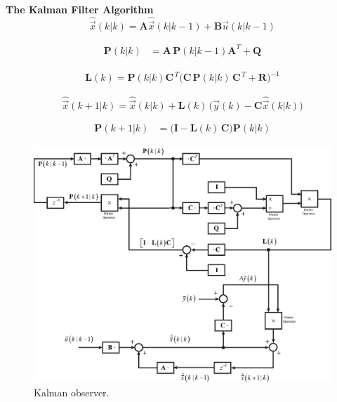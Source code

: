 \documentclass[11pt,a4paper,oneside]{book}
\numberwithin{equation}{section}
\theoremstyle{it}
\theoremstyle{definition}
\begin{document}
\begin{mybox}
	\noindent\textbf{The Kalman Filter Algorithm}
	\begin{equation}\label{im_control_problem_eq_9}
		\hat{\vec{x}}\left(k|k\right) = \mathbf{A} 
		\hat{\vec{x}}\left(k|k-1\right) + \mathbf{B} \vec{u}\left(k|k-1\right)
	\end{equation}
	
	\begin{equation}\label{im_control_problem_eq_10}
		\begin{aligned}
			\mathbf{P}\left(k|k\right) &= 
			\mathbf{A}\,\mathbf{P}\left(k|k-1\right) \mathbf{A}^T + \mathbf{Q} 
		\end{aligned}
	\end{equation}
	
	\begin{equation}\label{im_control_problem_eq_11}
		\begin{aligned}
			\mathbf{L}(k) = 
			\mathbf{P}(k|k)\mathbf{C}^{\,T}\Big(\mathbf{C}\,\mathbf{P}(k|k)\,\mathbf{C}^{\,T}+\mathbf{R}\Big)^{-1}
		\end{aligned}
	\end{equation}
	
	\begin{equation}\label{im_control_problem_eq_12}
		\hat{\vec{x}}\left(k+1|k\right) = \hat{\vec{x}}\left(k|k\right) + 
		\mathbf{L}(k)\, \Big(\vec{y}(k) - 
		\mathbf{C}\hat{\vec{x}}\left(k|k\right)\Big)
	\end{equation}
	
	\begin{equation}\label{im_control_problem_eq_13}
		\begin{aligned}
			\mathbf{P}\left(k+1|k\right) &= 
			\Big(\mathbf{I}-\mathbf{L}(k)\,\mathbf{C} \Big) 
			\mathbf{P}\left(k|k\right) 
		\end{aligned}
	\end{equation}
	\begin{figure}[H]
		\centering
		\includegraphics[width = 440pt, angle=0, 
		keepaspectratio]{figures/kalman/kalman_2.eps}
		\captionsetup{width=.5\textwidth}
		\caption{Kalman observer.}
		\label{figure_im_kalman}
	\end{figure}
\end{mybox}
\end{document}
